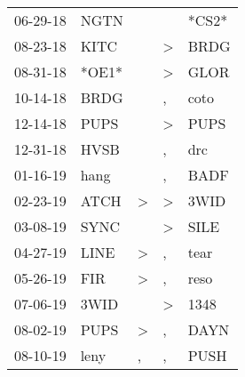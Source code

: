 \begin{supertabular}{p{0.07\textwidth}p{0.06\textwidth}p{0.02\textwidth}p{0.02\textwidth}p{0.06\textwidth}}
          06-29-18\textsuperscript{} &           NGTN\textsuperscript{} &                  &                  &                            *CS2* \\
          08-23-18\textsuperscript{} &           KITC\textsuperscript{} &                  &     \textgreater &           BRDG\textsuperscript{} \\
          08-31-18\textsuperscript{} &                            *OE1* &                  &     \textgreater &           GLOR\textsuperscript{} \\
          10-14-18\textsuperscript{} &           BRDG\textsuperscript{} &                  &                , &           coto\textsuperscript{} \\
          12-14-18\textsuperscript{} &           PUPS\textsuperscript{} &                  &     \textgreater &           PUPS\textsuperscript{} \\
          12-31-18\textsuperscript{} &           HVSB\textsuperscript{} &                  &                , &            drc\textsuperscript{} \\
          01-16-19\textsuperscript{} &           hang\textsuperscript{} &                  &                , &           BADF\textsuperscript{} \\
          02-23-19\textsuperscript{} &           ATCH\textsuperscript{} &     \textgreater &     \textgreater &           3WID\textsuperscript{} \\
          03-08-19\textsuperscript{} &           SYNC\textsuperscript{} &                  &     \textgreater &           SILE\textsuperscript{} \\
          04-27-19\textsuperscript{} &           LINE\textsuperscript{} &     \textgreater &                , &           tear\textsuperscript{} \\
          05-26-19\textsuperscript{} &            FIR\textsuperscript{} &     \textgreater &                , &           reso\textsuperscript{} \\
          07-06-19\textsuperscript{} &           3WID\textsuperscript{} &                  &     \textgreater &           1348\textsuperscript{} \\
          08-02-19\textsuperscript{} &           PUPS\textsuperscript{} &     \textgreater &                , &           DAYN\textsuperscript{} \\
          08-10-19\textsuperscript{} &           leny\textsuperscript{} &                , &                , &           PUSH\textsuperscript{} \\

\end{supertabular}
